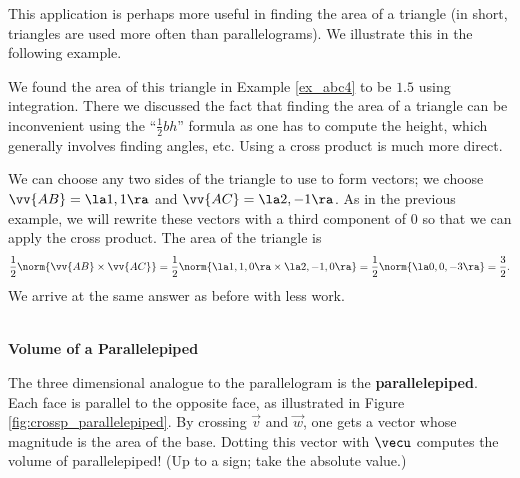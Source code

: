 \enlargethispage{2\baselineskip}
This application is perhaps more useful in finding the area of a triangle (in short, triangles are used more often than parallelograms). We illustrate this in the following example.\\

{We found the area of this triangle in Example \ref{ex_abc4} to be $1.5$ using integration. There we discussed the fact that finding the area of a triangle can be inconvenient using the ``$\frac12bh$'' formula as one has to compute the height, which generally involves finding angles, etc. Using a cross product is much more direct.

We can choose any two sides of the triangle to use to form vectors; we choose $\vv{AB} = \la 1,1\ra$ and $\vv{AC}=\la 2,-1\ra$. As in the previous example, we will rewrite these vectors with a third component of 0 so that we can apply the cross product. The area of the triangle is
$$\frac12\norm{\vv{AB}\times\vv{AC}} = \frac12\norm{\la 1,1,0\ra \times \la 2,-1,0\ra} = \frac12\norm{\la 0,0,-3\ra} = \frac32.$$
We arrive at the same answer as before with less work.
}\\

\noindent\textbf{Volume of a Parallelepiped}

The three dimensional analogue to the parallelogram is the \textbf{parallelepiped}. Each face is parallel to the opposite face, as illustrated in Figure \ref{fig:crossp_parallelepiped}. By crossing $\vec v$ and $\vec w$, one gets a vector whose magnitude is the area of the base. Dotting this vector with $\vecu$ computes the volume of parallelepiped! (Up to a sign; take the absolute value.)

